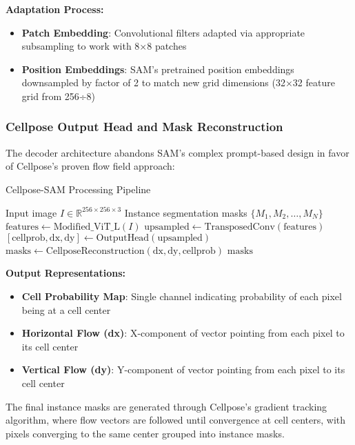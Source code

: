 \documentclass[../cellseek_paper.tex]{subfiles}
\begin{document}
\textbf{Adaptation Process:}
\begin{itemize}
  \item \textbf{Patch Embedding}: Convolutional filters adapted via appropriate subsampling to work with 8×8 patches
  \item \textbf{Position Embeddings}: SAM's pretrained position embeddings downsampled by factor of 2 to match new grid dimensions (32×32 feature grid from 256÷8)
\end{itemize}

\subsubsection{Cellpose Output Head and Mask Reconstruction}

The decoder architecture abandons SAM's complex prompt-based design in favor of Cellpose's proven flow field approach:

\begin{algorithm}[H]
  \caption{Cellpose-SAM Processing Pipeline}
  \begin{algorithmic}[1]
    \REQUIRE Input image $I \in \mathbb{R}^{256 \times 256 \times 3}$
    \ENSURE Instance segmentation masks $\{M_1, M_2, \ldots, M_N\}$
    \STATE $\text{features} \leftarrow \text{Modified\_ViT\_L}(I)$ 
    \STATE $\text{upsampled} \leftarrow \text{TransposedConv}(\text{features})$ 
    \STATE $[\text{cellprob}, \text{dx}, \text{dy}] \leftarrow \text{OutputHead}(\text{upsampled})$ 
    \STATE $\text{masks} \leftarrow \text{CellposeReconstruction}(\text{dx}, \text{dy}, \text{cellprob})$ 
    \RETURN $\text{masks}$
  \end{algorithmic}
\end{algorithm}

\textbf{Output Representations:}
\begin{itemize}
  \item \textbf{Cell Probability Map}: Single channel indicating probability of each pixel being at a cell center
  \item \textbf{Horizontal Flow (dx)}: X-component of vector pointing from each pixel to its cell center
  \item \textbf{Vertical Flow (dy)}: Y-component of vector pointing from each pixel to its cell center
\end{itemize}

The final instance masks are generated through Cellpose's gradient tracking algorithm, where flow vectors are followed until convergence at cell centers, with pixels converging to the same center grouped into instance masks.
\end{document}
